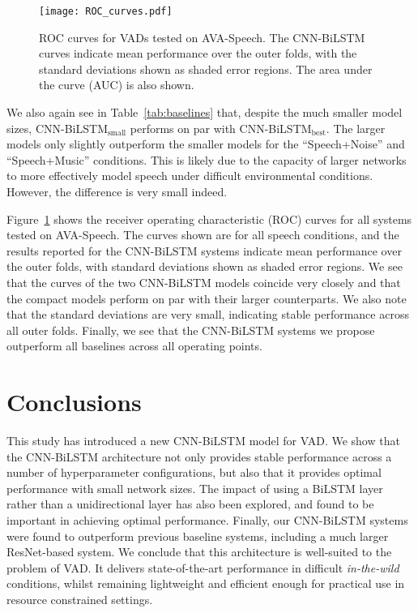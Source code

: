 \documentclass{article}
\begin{document}
\begin{figure}[htb]
\begin{minipage}[b]{1.0\linewidth}
  \centering
  \centerline{\texttt{[image: ROC\_curves.pdf]}}
\end{minipage}
\vspace{-6mm}
\caption{ROC curves for VADs tested on AVA-Speech. The CNN-BiLSTM curves indicate mean performance over the outer folds, with the standard deviations shown as shaded error regions. The area under the curve (AUC) is also shown.}
\label{fig:roc}
\vspace{-4mm}
\end{figure}

We also again see in \mbox{Table \ref{tab:baselines}} that, despite the much smaller model sizes, CNN-BiLSTM$_\text{small}$ performs on par with CNN-BiLSTM$_\text{best}$.
The larger models only slightly outperform the smaller models for the ``Speech+Noise'' and ``Speech+Music'' conditions.
This is likely due to the capacity of larger networks to more effectively model speech under difficult environmental conditions.
However, the difference is very small indeed.

\mbox{Figure \ref{fig:roc}} shows the receiver operating characteristic (ROC) curves for all systems tested on AVA-Speech.
The curves shown are for all speech conditions, and the results reported for the CNN-BiLSTM systems indicate mean performance over the outer folds, with standard deviations shown as shaded error regions.
We see that the curves of the two CNN-BiLSTM models coincide very closely and that the compact models perform on par with their larger counterparts.
We also note that the standard deviations are very small, indicating stable performance across all outer folds.
Finally, we see that the CNN-BiLSTM systems we propose outperform all baselines across all operating points.

\vspace{-2mm}

\section{Conclusions}
\label{sec:conclusions}

\vspace{-2mm}

This study has introduced a new CNN-BiLSTM model for VAD.
We show that the CNN-BiLSTM architecture not only provides stable performance across a number of hyperparameter configurations, but also that it provides optimal performance with small network sizes.
The impact of using a \mbox{BiLSTM} layer rather than a unidirectional layer has also been explored, and found to be important in achieving optimal performance.
Finally, our CNN-BiLSTM systems were found to outperform previous baseline systems, including a much larger ResNet-based system.
We conclude that this architecture is well-suited to the problem of VAD.
It delivers state-of-the-art performance in difficult \textit{in-the-wild} conditions, whilst remaining lightweight and efficient enough for practical use in resource constrained settings.
\end{document}
